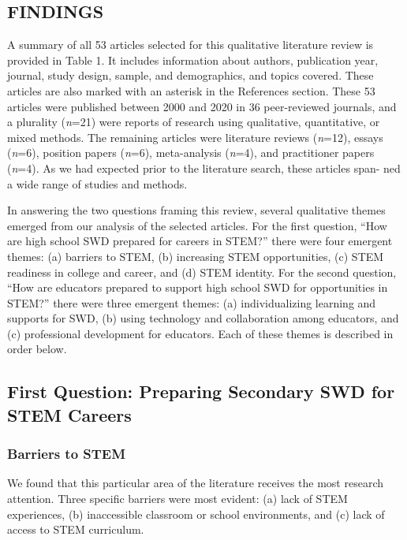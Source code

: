 \documentclass[11.5pt]{sig-alternate}
\begin{document}
\begin{large}
\section*{FINDINGS}
A summary of all 53 articles selected for this qualitative literature review is provided in Table 1. It includes information about authors, publication year, journal, study design, sample, and demographics, and topics covered. These articles are also marked with an asterisk in the References section. These 53 articles were published between 2000 and 2020 in 36 peer-reviewed journals, and a plurality (\textit{n}=21) were reports of research using qualitative, quantitative, or mixed methods. The remaining articles were literature reviews (\textit{n}=12), essays (\textit{n}=6), position papers (\textit{n}=6), meta-analysis (\textit{n}=4), and practitioner papers (\textit{n}=4). As we had expected prior to the literature search, these articles span- ned a wide range of studies and methods.  

In answering the two questions framing this review, several qualitative themes emerged from our analysis of the selected articles. For the first question, “How are high school SWD prepared for careers in STEM?” there were four emergent themes: (a) barriers to STEM, (b) increasing STEM opportunities, (c) STEM readiness in college and career, and (d) STEM identity. For the second question, “How are educators prepared to support high school SWD for opportunities in STEM?” there were three emergent themes: (a) individualizing learning and supports for SWD, (b) using technology and collaboration among educators, and (c) professional development for educators. Each of these themes is described in order below. 

\subsection*{First Question: Preparing Secondary SWD for STEM Careers}
\subsubsection*{Barriers to STEM}
We found that this particular area of the literature receives the most research attention. Three specific barriers were most evident: (a) lack of STEM experiences, (b) inaccessible classroom or school environments, and (c) lack of access to STEM curriculum.


\end{large}
\end{document}
